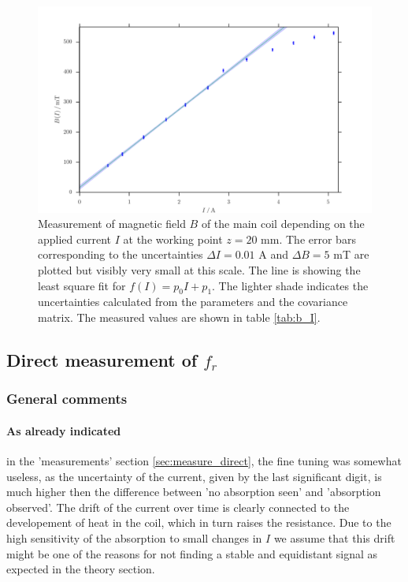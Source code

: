 \begin{figure}[H]
    \includegraphics[width=\textwidth]{figures/b_I.pdf}
    \caption{   
        Measurement of magnetic field $B$ of the main coil depending on the applied current 
        $I$ at the working point $z = 20$ mm. The error bars corresponding 
        to the uncertainties $\Delta I = 0.01$ A 
        and $\Delta B = 5$ mT are plotted but visibly very small at this scale. 
        The line is showing the least square fit for $f(I) = p_0 I + p_1$. The 
        lighter shade indicates the uncertainties calculated from the parameters 
        and the covariance matrix. 
        The measured values are shown in table \ref{tab:b_I}.
        }
    \label{fig:b_I}
\end{figure}


\subsection{Direct measurement of $f_r$}
\subsubsection{General comments}
\paragraph{As already indicated}
in the 'measurements' section \ref{sec:measure_direct}, 
the fine tuning was somewhat useless, as the uncertainty of the current, given by the last 
significant digit, is much higher then the difference between 'no absorption seen' and 
'absorption observed'. The drift of the current over time is clearly connected to the developement 
of heat in the coil, which in turn raises the resistance. Due to the high sensitivity of the absorption 
to small changes in $I$ we assume that this drift might be one of the reasons for not finding 
a stable and equidistant signal as expected in the theory section.

